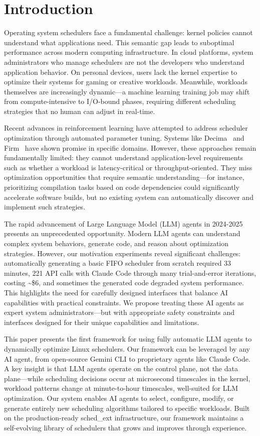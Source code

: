 \section{Introduction}

Operating system schedulers face a fundamental challenge: kernel policies cannot understand what applications need. This semantic gap leads to suboptimal performance across modern computing infrastructure. In cloud platforms, system administrators who manage schedulers are not the developers who understand application behavior. On personal devices, users lack the kernel expertise to optimize their systems for gaming or creative workloads. Meanwhile, workloads themselves are increasingly dynamic—a machine learning training job may shift from compute-intensive to I/O-bound phases, requiring different scheduling strategies that no human can adjust in real-time.

Recent advances in reinforcement learning have attempted to address scheduler optimization through automated parameter tuning. Systems like Decima~\cite{mao2019decima} and Firm~\cite{qiu2020firm} have shown promise in specific domains. However, these approaches remain fundamentally limited: they cannot understand application-level requirements such as whether a workload is latency-critical or throughput-oriented. They miss optimization opportunities that require semantic understanding—for instance, prioritizing compilation tasks based on code dependencies could significantly accelerate software builds, but no existing system can automatically discover and implement such strategies.

The rapid advancement of Large Language Model (LLM) agents in 2024-2025 presents an unprecedented opportunity. Modern LLM agents can understand complex system behaviors, generate code, and reason about optimization strategies. However, our motivation experiments reveal significant challenges: automatically generating a basic FIFO scheduler from scratch required 33 minutes, 221 API calls with Claude Code through many trial-and-error iterations, costing \textasciitilde\$6, and sometimes the generated code degraded system performance. This highlights the need for carefully designed interfaces that balance AI capabilities with practical constraints. We propose treating these AI agents as expert system administrators—but with appropriate safety constraints and interfaces designed for their unique capabilities and limitations.

This paper presents the first framework for using fully automatic LLM agents to dynamically optimize Linux schedulers. Our framework can be leveraged by any AI agent, from open-source Gemini CLI to proprietary agents like Claude Code. A key insight is that LLM agents operate on the control plane, not the data plane—while scheduling decisions occur at microsecond timescales in the kernel, workload patterns change at minute-to-hour timescales, well-suited for LLM optimization. Our system enables AI agents to select, configure, modify, or generate entirely new scheduling algorithms tailored to specific workloads. Built on the production-ready sched\_ext infrastructure, our framework maintains a self-evolving library of schedulers that grows and improves through experience.

